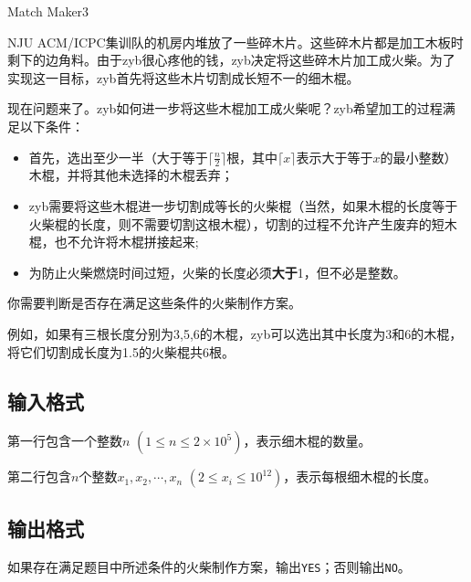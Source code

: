 \begin{Problem}{Match Maker}{3}

NJU ACM/ICPC集训队的机房内堆放了一些碎木片。这些碎木片都是加工木板时剩下的边角料。由于zyb很心疼他的钱，zyb决定将这些碎木片加工成火柴。为了实现这一目标，zyb首先将这些木片切割成长短不一的细木棍。

现在问题来了。zyb如何进一步将这些木棍加工成火柴呢？zyb希望加工的过程满足以下条件：

\begin{itemize}
\item 首先，选出至少一半（大于等于$\lceil \frac{n}{2} \rceil$根，其中$\lceil x \rceil$表示大于等于$x$的最小整数）木棍，并将其他未选择的木棍丢弃；
\item zyb需要将这些木棍进一步切割成等长的火柴棍（当然，如果木棍的长度等于火柴棍的长度，则不需要切割这根木棍），切割的过程不允许产生废弃的短木棍，也不允许将木棍拼接起来;
\item 为防止火柴燃烧时间过短，火柴的长度必须\textbf{大于}1，但不必是整数。
\end{itemize}

你需要判断是否存在满足这些条件的火柴制作方案。

例如，如果有三根长度分别为3,5,6的木棍，zyb可以选出其中长度为3和6的木棍，将它们切割成长度为1.5的火柴棍共6根。

\subsection*{输入格式}

第一行包含一个整数$n$ $(1 \leq n \leq 2 \times 10^5)$，表示细木棍的数量。

第二行包含$n$个整数$x_1, x_2, \cdots, x_n$ $(2 \leq x_i \leq 10^{12})$，表示每根细木棍的长度。

\subsection*{输出格式}

如果存在满足题目中所述条件的火柴制作方案，输出\texttt{YES}；否则输出\texttt{NO}。


\end{Problem}

